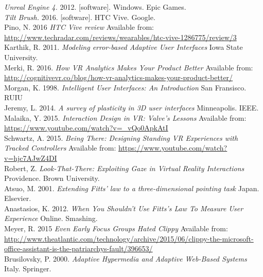 \documentclass[11pt]{article}
\begin{document}
\emph{Unreal Engine 4.} 2012. [software]. Windows. Epic Games. \\

\emph{Tilt Brush.} 2016. [software]. HTC Vive. Google. \\

Pino, N. 2016 \emph{HTC Vive review} Available from: \url{http://www.techradar.com/reviews/wearables/htc-vive-1286775/review/3} \\

Karthik, R. 2011. \emph{Modeling error-based Adaptive User Interfaces} Iowa State University. \\

Merki, R. 2016. \emph{How VR Analytics Makes Your Product Better} Available from: \url{http://cognitivevr.co/blog/how-vr-analytics-makes-your-product-better/} \\

Morgan, K. 1998. \emph{Intelligent User
Interfaces: An Introduction} San Fransisco. RUIU \\

Jeremy, L. 2014. \emph{A survey of plasticity in 3D user interfaces} Minneapolis. IEEE. \\

Malaika, Y. 2015. \emph{Interaction Design in VR: Valve's Lessons
} Available from: \url{https://www.youtube.com/watch?v=_vQo0ApkAtI} \\

Schwartz, A. 2015. \emph{Being There: Designing Standing VR Experiences with Tracked Controllers} Available from: \url{https://www.youtube.com/watch?v=hjc7AJwZ4DI
} \\

Robert, Z. \emph{Look-That-There: Exploiting Gaze in Virtual Reality Interactions} Providence. Brown University. \\

Atsuo, M. 2001. \emph{Extending Fitts' law to a three-dimensional pointing task} Japan. Elsevier. \\

Anastasios, K. 2012. \emph{When You Shouldn't Use Fitts's Law To Measure User Experience} Online. Smashing. \\

Meyer, R. 2015 \emph{Even Early Focus Groups Hated Clippy} Available from: \url{http://www.theatlantic.com/technology/archive/2015/06/clippy-the-microsoft-office-assistant-is-the-patriarchys-fault/396653/} \\

Brusilovsky, P. 2000. \emph{Adaptive Hypermedia and Adaptive Web-Based Systems} Italy. Springer.\\
\end{document}
